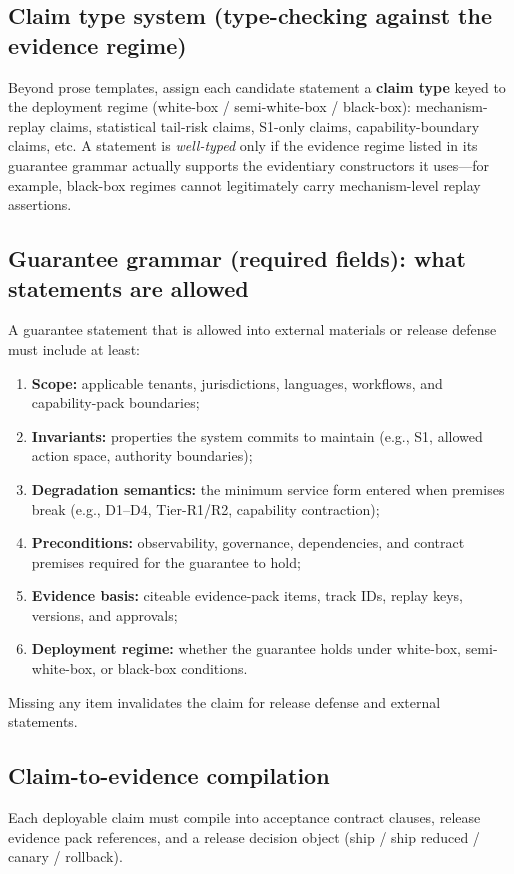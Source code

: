 \documentclass[11pt,a4paper]{report}
\begin{document}
\subsection{Claim type system (type-checking against the evidence regime)}
Beyond prose templates, assign each candidate statement a \textbf{claim type} keyed to the deployment regime (white-box / semi-white-box / black-box): mechanism-replay claims, statistical tail-risk claims, S1-only claims, capability-boundary claims, etc. A statement is \emph{well-typed} only if the evidence regime listed in its guarantee grammar actually supports the evidentiary constructors it uses---for example, black-box regimes cannot legitimately carry mechanism-level replay assertions.

\subsection{Guarantee grammar (required fields): what statements are allowed}
A guarantee statement that is allowed into external materials or release defense must include at least:
\begin{enumerate}
  \item \textbf{Scope:} applicable tenants, jurisdictions, languages, workflows, and capability-pack boundaries;
  \item \textbf{Invariants:} properties the system commits to maintain (e.g., S1, allowed action space, authority boundaries);
  \item \textbf{Degradation semantics:} the minimum service form entered when premises break (e.g., D1--D4, Tier-R1/R2, capability contraction);
  \item \textbf{Preconditions:} observability, governance, dependencies, and contract premises required for the guarantee to hold;
  \item \textbf{Evidence basis:} citeable evidence-pack items, track IDs, replay keys, versions, and approvals;
  \item \textbf{Deployment regime:} whether the guarantee holds under white-box, semi-white-box, or black-box conditions.
\end{enumerate}
\noindent Missing any item invalidates the claim for release defense and external statements.

\subsection{Claim-to-evidence compilation}
Each deployable claim must compile into acceptance contract clauses, release evidence pack references, and a release decision object (ship / ship reduced / canary / rollback).
\end{document}
